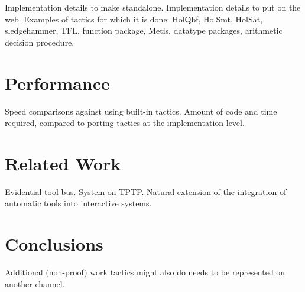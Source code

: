\documentclass{llncs}
\begin{document}
Implementation details to make standalone.
Implementation details to put on the web.
Examples of tactics for which it is done: HolQbf, HolSmt, HolSat, sledgehammer, TFL, function package, Metis, datatype packages, arithmetic decision procedure.

\section{Performance}

Speed comparisons against using built-in tactics.
Amount of code and time required, compared to porting tactics at the implementation level.

\section{Related Work}

Evidential tool bus.
System on TPTP.
Natural extension of the integration of automatic tools into interactive systems.

\section{Conclusions}

Additional (non-proof) work tactics might also do needs to be represented on another channel.



\end{document}
